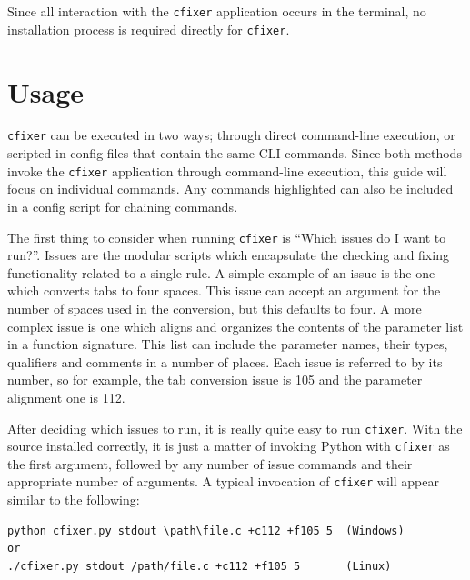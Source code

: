 \documentclass[11pt]{scrreprt}
\begin{document}
Since all interaction with the \texttt{cfixer} application occurs in the terminal, no installation process is required directly for \texttt{cfixer}.

\section{Usage}

\texttt{cfixer} can be executed in two ways; through direct command-line execution, or scripted in config files that contain the same CLI commands.
Since both methods invoke the \texttt{cfixer} application through command-line execution, this guide will focus on individual commands.
Any commands highlighted can also be included in a config script for chaining commands.

The first thing to consider when running \texttt{cfixer} is “Which issues do I want to run?”.
Issues are the modular scripts which encapsulate the checking and fixing functionality related to a single rule.
A simple example of an issue is the one which converts tabs to four spaces.
This issue can accept an argument for the number of spaces used in the conversion, but this defaults to four.
A more complex issue is one which aligns and organizes the contents of the parameter list in a function signature.
This list can include the parameter names, their types, qualifiers and comments in a number of places.
Each issue is referred to by its number, so for example, the tab conversion issue is 105 and the parameter alignment one is 112.

After deciding which issues to run, it is really quite easy to run \texttt{cfixer}. With the source installed correctly, it is just a matter of invoking Python with \texttt{cfixer} as the first argument, followed by any number of issue commands and their appropriate number of arguments. 
A typical invocation of \texttt{cfixer} will appear similar to the following:\\
\lstset{language=Python}
\begin{minipage}{\linewidth}
\begin{lstlisting}[frame=single,basicstyle=\small]
python cfixer.py stdout \path\file.c +c112 +f105 5	(Windows)
or
./cfixer.py stdout /path/file.c +c112 +f105 5		(Linux)
\end{lstlisting}
\end{minipage}
\end{document}
